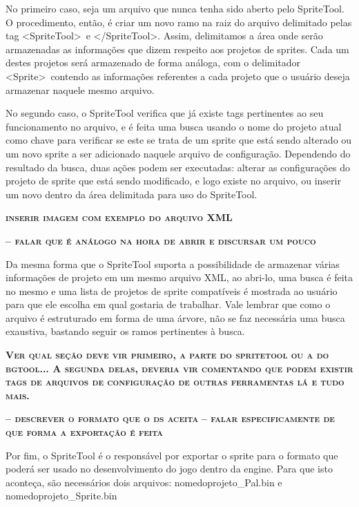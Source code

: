 \documentclass[brazil]{abnt}
\begin{document}
No primeiro caso, seja um arquivo que nunca tenha sido aberto pelo SpriteTool. O procedimento, então, é criar um novo ramo na raiz do arquivo delimitado pelas tag \textless SpriteTool\textgreater~e \textless /SpriteTool\textgreater. Assim, delimitamos a área onde serão armazenadas as informações que dizem respeito aos projetos de sprites. Cada um destes projetos será armazenado de forma análoga, com o delimitador \textless Sprite\textgreater~contendo as informações referentes a cada projeto que o usuário deseja armazenar naquele mesmo arquivo. 

No segundo caso, o SpriteTool verifica que já existe tags pertinentes ao seu funcionamento no arquivo, e é feita uma busca usando o nome do projeto atual como chave para verificar se este se trata de um sprite que está sendo alterado ou um novo sprite a ser adicionado naquele arquivo de configuração. Dependendo do resultado da busca, duas ações podem ser executadas: alterar as configurações do projeto de sprite que está sendo modificado, e logo existe no arquivo, ou inserir um novo dentro da área delimitada para uso do SpriteTool.

\textsc{\textbf{inserir imagem com exemplo do arquivo XML}}

\textsc{\textbf{-- falar que é análogo na hora de abrir e discursar um pouco}}

Da mesma forma que o SpriteTool suporta a possibilidade de armazenar várias informações de projeto em um mesmo arquivo XML, ao abri-lo, uma busca é feita no mesmo e uma lista de projetos de sprite compatíveis é mostrada ao usuário para que ele escolha em qual gostaria de trabalhar. Vale lembrar que como o arquivo é estruturado em forma de uma árvore, não se faz necessária uma busca exaustiva, bastando seguir os ramos pertinentes à busca. 

\textsc{\textbf{Ver qual seção deve vir primeiro, a parte do spritetool ou a do bgtool... A segunda delas, deveria vir comentando que podem existir tags de arquivos de configuração de outras ferramentas lá e tudo mais.}}

\textsc{\textbf{-- descrever o formato que o ds aceita}}
\textsc{\textbf{-- falar especificamente de que forma a exportação é feita}}

Por fim, o SpriteTool é o responsável por exportar o sprite para o formato que poderá ser usado no desenvolvimento do jogo dentro da engine. Para que isto aconteça, são necessários dois arquivos: nomedoprojeto\_Pal.bin e nomedoprojeto\_Sprite.bin
\end{document}
